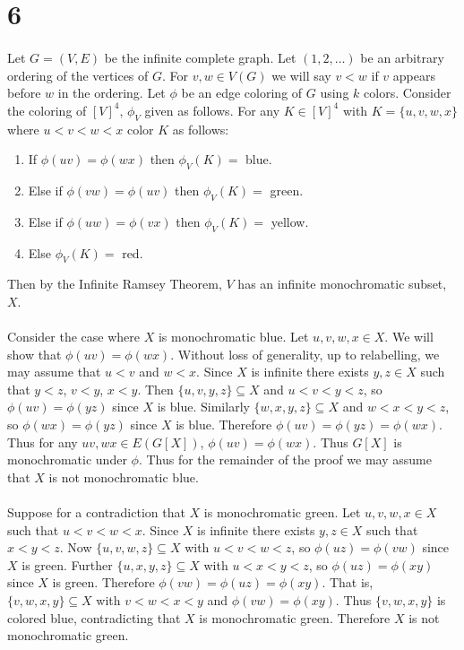 \documentclass[letterpaper,12pt,oneside,onecolumn]{article}
\begin{document}
\section*{6}
\paragraph{}
Let $G=(V,E)$ be the infinite complete graph. Let $(1,2,\dots)$ be an arbitrary ordering of the vertices of $G$. For $v,w \in V(G)$ we will say $v < w$ if $v$ appears before $w$ in the ordering. Let $\phi$ be an edge coloring of $G$ using $k$ colors. Consider the coloring of $[V]^4$, $\phi_V$ given as follows. For any $K \in [V]^4$ with $K = \{u,v,w,x\}$ where $u<v<w<x$ color $K$ as follows:
\begin{enumerate}
\item If $\phi(uv) = \phi(wx)$ then $\phi_V(K)=$ blue.
\item Else if $\phi(vw)=\phi(uv)$ then $\phi_V(K)=$ green.
\item Else if $\phi(uw) = \phi(vx)$ then $\phi_V(K)=$ yellow.
\item Else $\phi_V(K)=$  red.
\end{enumerate}
Then by the Infinite Ramsey Theorem, $V$ has an infinite monochromatic subset, $X$.
\paragraph{}
Consider the case where $X$ is monochromatic blue. Let $u,v,w,x \in X$. We will show that $\phi(uv) = \phi(wx)$. Without loss of generality, up to relabelling, we may assume that $u<v$ and $w<x$. Since $X$ is infinite there exists $y,z \in X$ such that $y<z$, $v<y$, $x<y$. Then $\{u,v,y,z\} \subseteq X$ and $u<v<y<z$, so $\phi(uv) = \phi(yz)$ since $X$ is blue. Similarly $\{w,x,y,z\} \subseteq X$ and $w<x<y<z$, so $\phi(wx) = \phi(yz)$ since $X$ is blue. Therefore $\phi(uv)=\phi(yz)=\phi(wx)$. Thus for any $uv,wx \in E(G[X])$, $\phi(uv) = \phi(wx)$. Thus $G[X]$ is monochromatic under $\phi$. Thus for the remainder of the proof we may assume that $X$ is not monochromatic blue.
\paragraph{}
Suppose for a contradiction that $X$ is monochromatic green. Let $u,v,w,x \in X$ such that $u<v<w<x$. Since $X$ is infinite there exists $y,z \in X$ such that $x<y<z$. Now $\{u,v,w,z\} \subseteq X$ with $u<v<w<z$, so $\phi(uz) = \phi(vw)$ since $X$ is green. Further $\{u,x,y,z\} \subseteq X$ with $u<x<y<z$, so $\phi(uz) = \phi(xy)$ since $X$ is green. Therefore $\phi(vw) = \phi(uz) = \phi(xy)$. That is, $\{v,w,x,y\} \subseteq X$ with $v<w<x<y$ and $\phi(vw) = \phi(xy)$. Thus $\{v,w,x,y\}$ is colored blue, contradicting that $X$ is monochromatic green. Therefore $X$ is not monochromatic green.
\end{document}
